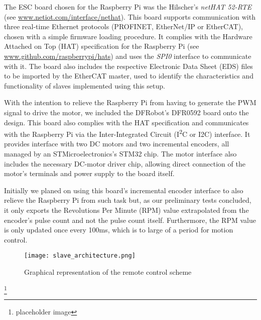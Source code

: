 The ESC board chosen for the Raspberry Pi was the Hilscher's \emph{netHAT 52-RTE} (see \url{www.netiot.com/interface/nethat}).
This board supports communication with three real-time Ethernet protocols (PROFINET, EtherNet/IP or EtherCAT), chosen with a simple firmware loading procedure.
It complies with the Hardware Attached on Top (HAT) specification for the Raspberry Pi (see \url{www.github.com/raspberrypi/hats}) and uses the \emph{SPI0} interface to communicate with it.
The board also includes the respective Electronic Data Sheet (EDS) files to be imported by the EtherCAT master, used to identify the characteristics and functionality of slaves implemented using this setup.


With the intention to relieve the Raspberry Pi from having to generate the PWM signal to drive the motor, we included the DFRobot's DFR0592 board onto the design.
This board also complies with the HAT specification and communicates with the Raspberry Pi via the Inter-Integrated Circuit (I\textsuperscript{2}C or I2C) interface.
It provides interface with two DC motors and two incremental encoders, all managed by an STMicroelectronics's STM32 chip.
The motor interface also includes the necessary DC-motor driver chip, allowing direct connection of the motor's terminals and power supply to the board itself.

Initially we planed on using this board's incremental encoder interface to also relieve the Raspberry Pi from such task but, as our preliminary tests concluded, it only exports the Revolutions Per Minute (RPM) value extrapolated from the encoder's pulse count and not the pulse count itself.
Furthermore, the RPM value is only updated once every 100ms, which is to large of a period for motion control.

\begin{figure}[htp]
	\centering
	\texttt{[image: slave\_architecture.png]}
	\caption{Graphical representation of the remote control scheme}
	\label{fig:slave_architecture}
\end{figure}\footnote{placeholder image}
